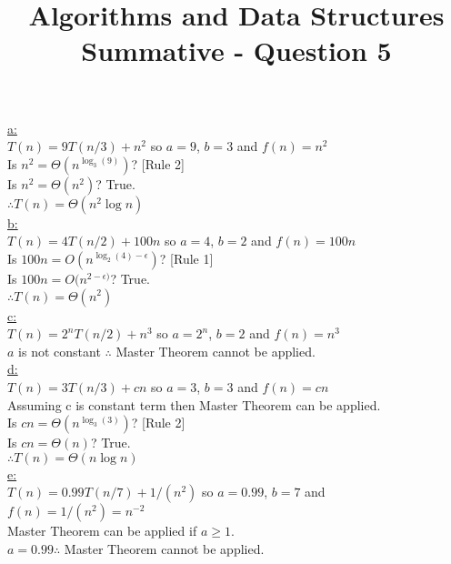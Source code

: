 \documentclass[10pt,a4paper]{article}
\title{Algorithms and Data Structures Summative - Question 5}
\begin{document}
	\underline{a:}\\
	$T(n) = 9T(n/3) + n^2$ so $a=9$, $b=3$ and $f(n) = n^2$\\
	Is $n^2 = \Theta(n^{\log_3(9)})$? [Rule 2]\\
	Is $n^2 = \Theta(n^{2})$? True.\\
	$\therefore T(n) = \Theta(n^2\log n)$\\
	
	\underline{b:}\\
	$T(n) = 4T(n/2) + 100n$ so $a=4$, $b=2$ and $f(n) = 100n$\\
	Is $100n = O(n^{\log_2(4) - \epsilon})$? [Rule 1]\\
	Is $100n = O(n^{2 - \epsilon)}$? True.\\
	$\therefore T(n) = \Theta(n^2)$\\
	
	\underline{c:}\\
	$T(n) = 2^nT(n/2) + n^3$ so $a=2^n$, $b=2$ and $f(n) = n^3$\\
	$a$ is not constant $\therefore$ Master Theorem cannot be applied.\\
	
	\underline{d:}\\
	$T(n) = 3T(n/3) + cn$ so $a=3$, $b=3$ and $f(n) = cn$\\
	Assuming c is constant term then Master Theorem can be applied.\\
	Is $cn = \Theta(n^{\log_3(3)})$? [Rule 2]\\
	Is $cn = \Theta(n)$? True.\\
	$\therefore T(n) = \Theta(n\log n)$\\
	
	\underline{e:}\\
	$T(n) = 0.99T(n/7) + 1/(n^2)$ so $a=0.99$, $b=7$ and $f(n) = 1/(n^2) = n^{-2}$\\
	Master Theorem can be applied if $a \geq 1$.\\
	$a=0.99 \therefore$ Master Theorem cannot be applied.\\
\end{document}
